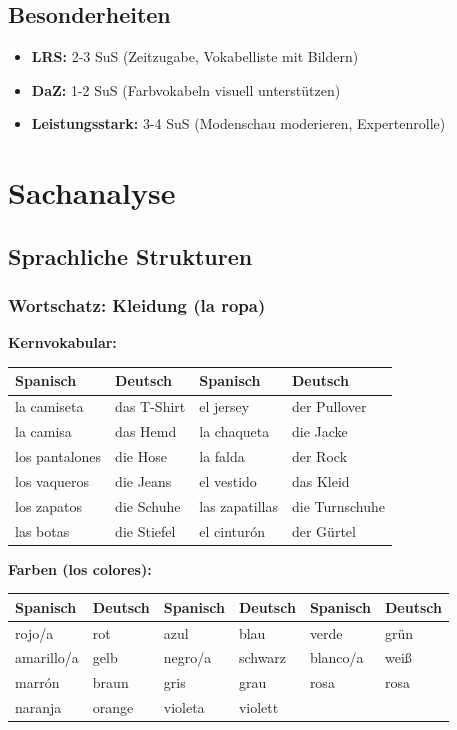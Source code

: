 \documentclass[11pt,a4paper]{article}
\begin{document}
\subsection{Besonderheiten}
\begin{itemize}
    \item \textbf{LRS:} 2-3 SuS (Zeitzugabe, Vokabelliste mit Bildern)
    \item \textbf{DaZ:} 1-2 SuS (Farbvokabeln visuell unterstützen)
    \item \textbf{Leistungsstark:} 3-4 SuS (Modenschau moderieren, Expertenrolle)
\end{itemize}

\section{Sachanalyse}

\subsection{Sprachliche Strukturen}

\subsubsection{Wortschatz: Kleidung (la ropa)}

\textbf{Kernvokabular:}
\begin{center}
\begin{tabular}{ll|ll}
\textbf{Spanisch} & \textbf{Deutsch} & \textbf{Spanisch} & \textbf{Deutsch} \\
\hline
la camiseta & das T-Shirt & el jersey & der Pullover \\
la camisa & das Hemd & la chaqueta & die Jacke \\
los pantalones & die Hose & la falda & der Rock \\
los vaqueros & die Jeans & el vestido & das Kleid \\
los zapatos & die Schuhe & las zapatillas & die Turnschuhe \\
las botas & die Stiefel & el cinturón & der Gürtel \\
\end{tabular}
\end{center}

\textbf{Farben (los colores):}
\begin{center}
\begin{tabular}{ll|ll|ll}
\textbf{Spanisch} & \textbf{Deutsch} & \textbf{Spanisch} & \textbf{Deutsch} & \textbf{Spanisch} & \textbf{Deutsch} \\
\hline
rojo/a & rot & azul & blau & verde & grün \\
amarillo/a & gelb & negro/a & schwarz & blanco/a & weiß \\
marrón & braun & gris & grau & rosa & rosa \\
naranja & orange & violeta & violett & & \\
\end{tabular}
\end{center}
\end{document}
